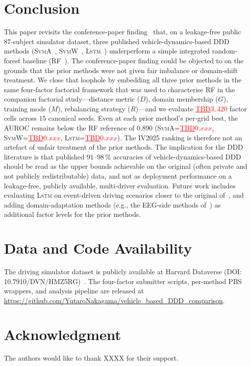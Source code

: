 \documentclass[lettersize,journal]{IEEEtran}
\newcommand{\Impl}[1]{\textsc{#1}}
\newcommand{\TBD}[1]{\textcolor{red}{\underline{TBD#1}}}
\begin{document}
\section{Conclusion}
\label{sec:conclusion}
This paper revisits the conference-paper finding~\cite{nakagama2025iv} that, on a leakage-free public 87-subject simulator dataset, three published vehicle-dynamics-based DDD methods (\Impl{SvmA}~\cite{arefnezhad2019}, \Impl{SvmW}~\cite{zhao2009}, \Impl{Lstm}~\cite{wang2022}) underperform a simple integrated random-forest baseline (\Impl{RF}~\cite{nakagama2025factorial}).
The conference-paper finding could be objected to on the grounds that the prior methods were not given fair imbalance or domain-shift treatment.
We close that loophole by embedding all three prior methods in the same four-factor factorial framework that was used to characterise \Impl{RF} in the companion factorial study---distance metric ($D$), domain membership ($G$), training mode ($M$), rebalancing strategy ($R$)---and we evaluate \TBD{$3{,}420$} factor cells across $15$ canonical seeds.
Even at each prior method's per-grid best, the AUROC remains below the \Impl{RF} reference of $0.890$ (\Impl{SvmA}=\TBD{$0.\textit{xxx}$}, \Impl{SvmW}=\TBD{$0.\textit{xxx}$}, \Impl{Lstm}=\TBD{$0.\textit{xxx}$}).
The IV2025 ranking is therefore not an artefact of unfair treatment of the prior methods.
The implication for the DDD literature is that published $91$--$98\,\%$ accuracies of vehicle-dynamics-based DDD should be read as the upper bounds achievable on the original (often private and not publicly redistributable) data, and not as deployment performance on a leakage-free, publicly available, multi-driver evaluation.
Future work includes evaluating \Impl{Lstm} on event-driven driving scenarios closer to the original of~\cite{wang2022}, and adding domain-adaptation methods (e.g., the EEG-side methods of~\cite{kim2025,li2026}) as additional factor levels for the prior methods.

\section*{Data and Code Availability}
The driving simulator dataset is publicly available at Harvard Dataverse (DOI: 10.7910/DVN/HMZ5RG)~\cite{aygun2024}.
The four-factor submitter scripts, per-method PBS wrappers, and analysis pipeline are released at \url{https://github.com/YutaroNakagama/vehicle_based_DDD_comparison}.

\section*{Acknowledgment}
The authors would like to thank XXXX for their support.
\end{document}
